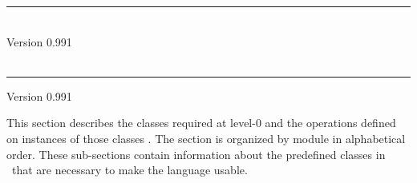 \documentclass[twocolumn,wd,9pt]{isov2}
\newcommand{\version}{0.991}
\renewcommand{\extrahead}{Version \version}
\begin{document}
\begin{cover}
    \vspace*{\fill}
    \hrule
    \vspace{0.3cm}
    {\Huge \thestandard} \\
    \vspace{0.3cm}
    {\LARGE Version \version} \\
    \ISname \\
    \vspace{0.5cm}
    \hrule
    \clearpage
\end{cover}



\title{}{\thestandard}{\extrahead}






\newpage
\gdef\module{} \newpage

\gdef\module{telos0} \newpage
\gdef\module{threads} \newpage
\gdef\module{condition} \newpage
\gdef\module{eulisp0} \newpage

\label{section:level-0}
This section describes the classes required at level-0 and the operations
defined on instances of those classes .  The
section is organized by module in alphabetical order.  These sub-sections
contain information about the predefined classes in \eulisp\ that are necessary
to make the language usable.

\gdef\module{character} 
\gdef\module{collection} \newpage
\gdef\module{compare} \newpage
\gdef\module{convert} \newpage
\gdef\module{copy} \newpage
\gdef\module{double} \newpage
\gdef\module{mathlib} \newpage
\gdef\module{float} \newpage
\gdef\module{fpint} \newpage
\gdef\module{formatted-io} \newpage
\gdef\module{integer} \newpage
\gdef\module{keyword} \newpage
\gdef\module{list} \newpage
\gdef\module{number} \newpage
\gdef\module{stream} \newpage
\gdef\module{string} \newpage
\gdef\module{symbol} \newpage
\gdef\module{table} \newpage
\gdef\module{vector} \newpage
\gdef\module{level-0}\newpage
\end{document}

